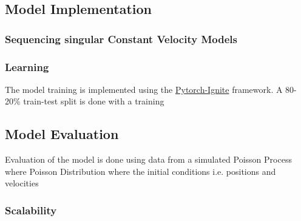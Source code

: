 \subsection{Model Implementation}
\label{sec:Method:ModelImplementation}



\subsubsection{Sequencing singular Constant Velocity Models}
\label{sec:Method:ModelImplementation:}



\subsubsection{Learning}
\label{sec:Method:ModelImplementation:Learning}
The model training is implemented using the \hyperlink{https://pytorch-ignite.ai/}{Pytorch-Ignite} framework.
A 80-20\% train-test split is done with a training 

\subsection{Model Evaluation}
Evaluation of the model is done using data from a simulated Poisson Process where Poisson Distribution where the initial conditions i.e. positions and velocities

\subsubsection{Scalability}
\label{sec:Method:ModelImplementation:Scalability}

